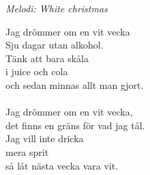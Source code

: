 {\footnotesize\textit{Melodi: White christmas}}\par
\vspace{10pt}
Jag drömmer om en vit vecka\\
Sju dagar utan alkohol.\\
Tänk att bara skåla\\
i juice och cola\\
och sedan minnas allt man gjort.\\
\\
Jag drömmer om en vit vecka,\\
det finns en gräns för vad jag tål.\\
Jag vill inte dricka\\
mera sprit\\
så låt nästa vecka vara vit.
